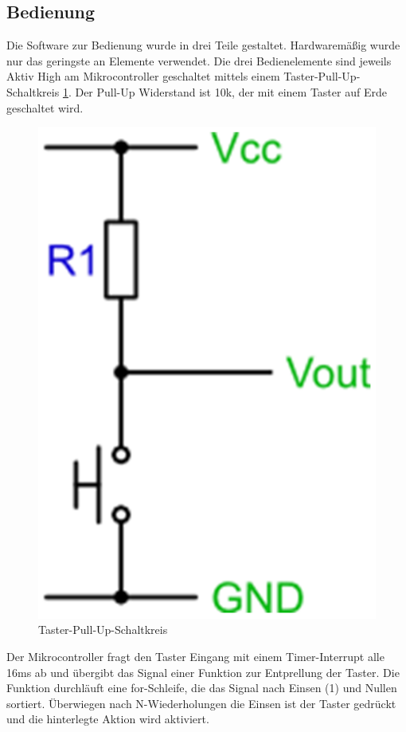 \subsection{Bedienung}
Die Software zur Bedienung wurde in drei Teile gestaltet. Hardwaremäßig wurde nur das geringste an Elemente verwendet. Die drei Bedienelemente sind jeweils Aktiv High am Mikrocontroller geschaltet mittels einem Taster-Pull-Up-Schaltkreis \ref{fig:SwitchPullUp_Software}. Der Pull-Up Widerstand ist 10k\Omega, der mit einem Taster auf Erde geschaltet wird.

\begin{figure}[h]
	\centering
		\includegraphics[width=1.00\textwidth]{switchpullupcircuit.jpg}
	\caption{Taster-Pull-Up-Schaltkreis}
	\label{fig:SwitchPullUp_Software}
\end{figure}

Der Mikrocontroller fragt den Taster Eingang mit einem Timer-Interrupt alle 16ms ab und übergibt das Signal einer Funktion zur Entprellung der Taster. Die Funktion durchläuft eine for-Schleife, die das Signal nach Einsen (1) und Nullen sortiert. Überwiegen nach N-Wiederholungen die Einsen ist der Taster gedrückt und die hinterlegte Aktion wird aktiviert. \newline
